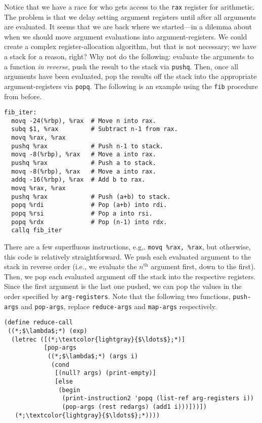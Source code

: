 Notice that we have a race for who gets access to the \texttt{rax} register for arithmetic. The problem is that we delay setting argument registers until after all arguments are evaluated. It seems that we are back where we started---in a dilemma about when we should move argument evaluations into argument-registers. We could create a complex register-allocation algorithm, but that is not necessary; we have a stack for a reason, right? Why not do the following: evaluate the arguments to a function \textit{in reverse}, push the result to the stack via \texttt{pushq}. Then, once all arguments have been evaluated, pop the results off the stack into the appropriate argument-registers via \texttt{popq}. The following is an example using the \texttt{fib} procedure from before.

\begin{cl}[]{}
\begin{lstlisting}[language=MyAssembly]
fib_iter:
  movq -24(%rbp), %rax  # Move n into rax.
  subq $1, %rax         # Subtract n-1 from rax.
  movq %rax, %rax    
  pushq %rax            # Push n-1 to stack.
  movq -8(%rbp), %rax   # Move a into rax.
  pushq %rax            # Push a to stack.
  movq -8(%rbp), %rax   # Move a into rax.
  addq -16(%rbp), %rax  # Add b to rax.
  movq %rax, %rax      
  pushq %rax            # Push (a+b) to stack.
  popq %rdi             # Pop (a+b) into rdi.
  popq %rsi             # Pop a into rsi.
  popq %rdx             # Pop (n-1) into rdx.
  callq fib_iter
\end{lstlisting}
\end{cl}

There are a few superfluous instructions, e.g,. \texttt{movq \%rax, \%rax}, but otherwise, this code is relatively straightforward. We push each evaluated argument to the stack in reverse order (i.e., we evaluate the $n^{\text{th}}$ argument first, down to the first). Then, we pop each evaluated argument off the stack into the respective registers. Since the first argument is the last one pushed, we can pop the values in the order specified by \texttt{arg-registers}. Note that the following two functions, \texttt{push-args} and \texttt{pop-args}, replace \texttt{reduce-args} and \texttt{map-args} respectively.

\begin{cl}[]{}\begin{lstlisting}[language=MyScheme]
(define reduce-call
 ((*;$\lambda$;*) (exp)
  (letrec ([(*;\textcolor{lightgray}{$\ldots$};*)]
           [pop-args 
            ((*;$\lambda$;*) (args i)
             (cond
              [(null? args) (print-empty)]
              [else 
               (begin
                (print-instruction2 'popq (list-ref arg-registers i))
                (pop-args (rest redargs) (add1 i)))]))])
   (*;\textcolor{lightgray}{$\ldots$};*))))
\end{lstlisting}\end{cl} 

